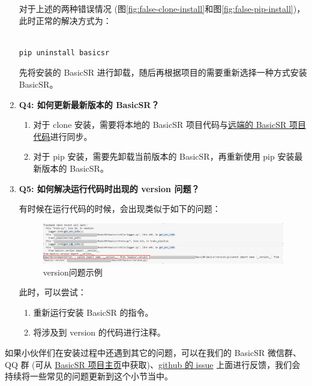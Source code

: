 \documentclass[../main.tex]{subfiles}
\begin{document}
\begin{enumerate}
\begin{enumerate}
\end{enumerate}


    对于上述的两种错误情况 (图\ref{fig:false-clone-install}和图\ref{fig:false-pip-install})，此时正常的解决方式为：
\begin{verbatim}

pip uninstall basicsr

\end{verbatim}

    先将安装的 BasicSR 进行卸载，随后再根据项目的需要重新选择一种方式安装 BasicSR。

    \item \textbf{Q4: 如何更新最新版本的 BasicSR？}

\begin{enumerate}
    \item 对于 clone 安装，需要将本地的 BasicSR 项目代码与\href{https://github.com/XPixelGroup/BasicSR}{远端的 BasicSR 项目代码}进行同步。
    \item 对于 pip 安装，需要先卸载当前版本的 BasicSR，再重新使用 pip 安装最新版本的 BasicSR。
\end{enumerate}

    \item \textbf{Q5: 如何解决运行代码时出现的 version 问题？}

    有时候在运行代码的时候，会出现类似于如下的问题：
    \begin{figure}[H]
	\begin{center}
		\includegraphics[width=0.8\linewidth]{figures/installation_version.jpg}
		\caption{version问题示例}
		\label{fig:version}
	\end{center}
	\vspace{-0.5cm}
    \end{figure}
    此时，可以尝试：
    \begin{enumerate}
        \item 重新运行安装 BasicSR 的指令。
        \item 将涉及到 version 的代码进行注释。
    \end{enumerate}

\end{enumerate}

\begin{hl}
    如果小伙伴们在安装过程中还遇到其它的问题，可以在我们的 BasicSR 微信群、 QQ 群 (可从 \href{https://github.com/XPixelGroup/BasicSR/blob/master/README_CN.md}{BasicSR 项目主页}中获取)、\href{https://github.com/XPixelGroup/BasicSR/issues}{github 的 issue} 上面进行反馈，我们会持续将一些常见的问题更新到这个小节当中。
\end{hl}
\end{document}
